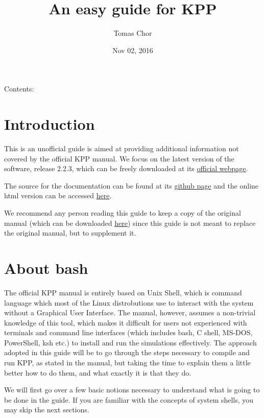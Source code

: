 \documentclass[letterpaper,10pt,openany,oneside]{sphinxmanual}
\title{An easy guide for KPP}
\date{Nov 02, 2016}
\author{Tomas Chor}
\begin{document}
\maketitle
\tableofcontents
{}\label{index::doc}


Contents:


\chapter{Introduction}
\label{README:introduction}\label{README:easy-guide-to-compiling-and-running-kpp}\label{README::doc}
This is an unofficial guide is aimed at providing additional information not
covered by the official KPP manual. We focus on the latest version of the
software, release 2.2.3, which can be freely downloaded at its \href{http://people.cs.vt.edu/~asandu/Software/Kpp/}{official
webpage}.

The source for the documentation can be found at its \href{https://github.com/tomchor/ezkpp}{github page} and the online html version can be
accessed \href{https://tomchor.github.io/ezkpp/}{here}.

We recommend any person reading this guide to keep a copy of the original
manual (which can be downloaded \href{http://people.cs.vt.edu/~asandu/Software/Kpp/}{here}) since this guide is not
meant to replace the original manual, but to supplement it.


\chapter{About bash}
\label{bash:about-bash}\label{bash::doc}
The official KPP manual is entirely based on Unix Shell, which is command
language which most of the Linux distrobutions use to interact with the system
without a Graphical User Interface. The manual, however, assumes a non-trivial
knowledge of this tool, which makes it difficult for users not experienced with
terminals and command line interfaces (which includes bash, C shell, MS-DOS,
PowerShell, ksh etc.) to install and run the simulations effectively. The
approach adopted in this guide will be to go through the steps necessary to
compile and run KPP, as stated in the manual, but taking the time to explain
them a little better how to do them, and what exactly it is that they do.

We will first go over a few basic notions necessary to understand what is going
to be done in the guide. If you are familiar with the concepts of system shells,
you may skip the next sections.
\end{document}
